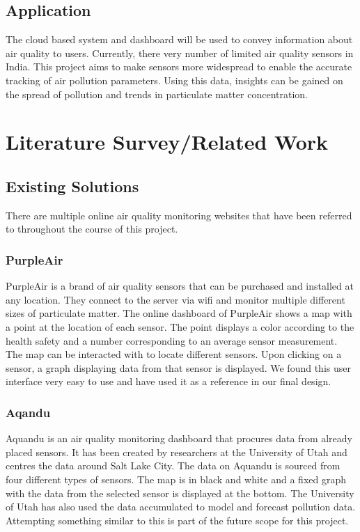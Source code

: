 \documentclass[]{report}
\begin{document}
\section{Application}
The cloud based system and dashboard will be used to convey information about air quality to users. Currently, there very number of limited air quality sensors in India. This project aims to make sensors more widespread to enable the accurate tracking of air pollution parameters. Using this data, insights can be gained on the spread of pollution and trends in particulate matter concentration.


\chapter{Literature Survey/Related Work} 

\section{Existing Solutions}
There are multiple online air quality monitoring websites that have been referred to throughout the course of this project.

\subsection{PurpleAir}
PurpleAir\cite{purpleair} is a brand of air quality sensors that can be purchased and installed at any location. They connect to the server via wifi and monitor multiple different sizes of particulate matter. The online dashboard of PurpleAir shows a map with a point at the location of each sensor. The point displays a color according to the health safety and a number corresponding to an average sensor measurement. The map can be interacted with to locate different sensors. Upon clicking on a sensor, a graph displaying data from that sensor is displayed. We found this user interface very easy to use and have used it as a reference in our final design.

\subsection{Aqandu}
Aquandu\cite{aqandu} is an air quality monitoring dashboard that procures data from already placed sensors. It has been created by researchers at the University of Utah and centres the data around Salt Lake City. The data on Aquandu is sourced from four different types of sensors. The map is in black and white and a fixed graph with the data from the selected sensor is displayed at the bottom. The University of Utah has also used the data accumulated to model and forecast pollution data.\cite{aqandu:mlvideo} Attempting something similar to this is part of the future scope for this project.
\end{document}
